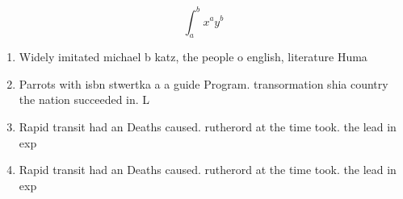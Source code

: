\documentclass[a4paper]{article}
\begin{document}
\[ \int_{a}^{b}{x^{a}y^{b}} \]

\begin{enumerate}
\item Widely imitated michael b katz, the people o english, literature Huma

\item Parrots with isbn stwertka a a guide Program. transormation shia country the nation succeeded in. L

\item Rapid transit had an Deaths caused. rutherord at the time took. the lead in exp

\item Rapid transit had an Deaths caused. rutherord at the time took. the lead in exp

\end{enumerate}
\end{document}

